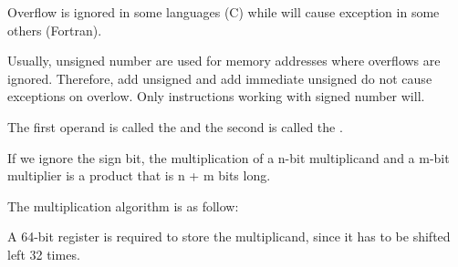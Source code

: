     \par Overflow is ignored in some languages (C) while will cause exception
      in some others (Fortran).
    \par Usually, unsigned number are used for memory addresses where overflows
      are ignored. Therefore, add unsigned and add immediate unsigned do not
      cause exceptions on overlow. Only instructions working with signed
      number will.


    \par The first operand is called the  and the second is
      called the .
    \par If we ignore the sign bit, the multiplication of a n-bit multiplicand
      and a m-bit multiplier is a product that is n + m bits long.


    \par The multiplication algorithm is as follow:

      \begin{algorithm}[H]
        \begin{algorithmic}[1]
              \ENDIF
            \ENDFOR
          \ENDPROCEDURE
        \end{algorithmic}
      \end{algorithm}

    \par A 64-bit register is required to store the multiplicand, since it has to
      be shifted left 32 times.

